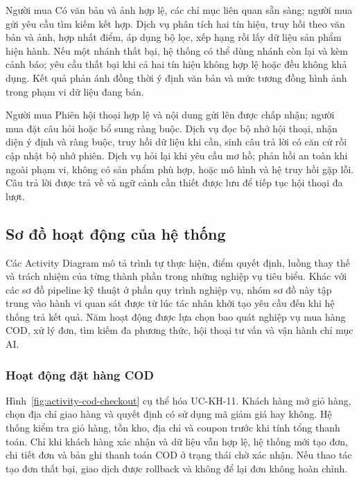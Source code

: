 {Người mua}
{Có văn bản và ảnh hợp lệ, các chỉ mục liên quan sẵn sàng; người mua gửi yêu cầu tìm kiếm kết hợp.}
{Dịch vụ phân tích hai tín hiệu, truy hồi theo văn bản và ảnh, hợp nhất điểm, áp dụng bộ lọc, xếp hạng rồi lấy dữ liệu sản phẩm hiện hành.}
{Nếu một nhánh thất bại, hệ thống có thể dùng nhánh còn lại và kèm cảnh báo; yêu cầu thất bại khi cả hai tín hiệu không hợp lệ hoặc đều không khả dụng.}
{Kết quả phản ánh đồng thời ý định văn bản và mức tương đồng hình ảnh trong phạm vi dữ liệu đang bán.}

{Người mua}
{Phiên hội thoại hợp lệ và nội dung gửi lên được chấp nhận; người mua đặt câu hỏi hoặc bổ sung ràng buộc.}
{Dịch vụ đọc bộ nhớ hội thoại, nhận diện ý định và ràng buộc, truy hồi dữ liệu khi cần, sinh câu trả lời có căn cứ rồi cập nhật bộ nhớ phiên.}
{Dịch vụ hỏi lại khi yêu cầu mơ hồ; phản hồi an toàn khi ngoài phạm vi, không có sản phẩm phù hợp, hoặc mô hình và hệ truy hồi gặp lỗi.}
{Câu trả lời được trả về và ngữ cảnh cần thiết được lưu để tiếp tục hội thoại đa lượt.}

\FloatBarrier

\subsection{Sơ đồ hoạt động của hệ thống}

Các Activity Diagram mô tả trình tự thực hiện, điểm quyết định, luồng thay thế và trách nhiệm của từng thành phần trong những nghiệp vụ tiêu biểu. Khác với các sơ đồ pipeline kỹ thuật ở phần quy trình nghiệp vụ, nhóm sơ đồ này tập trung vào hành vi quan sát được từ lúc tác nhân khởi tạo yêu cầu đến khi hệ thống trả kết quả. Năm hoạt động được lựa chọn bao quát nghiệp vụ mua hàng COD, xử lý đơn, tìm kiếm đa phương thức, hội thoại tư vấn và vận hành chỉ mục AI.

\subsubsection{Hoạt động đặt hàng COD}

Hình~\ref{fig:activity-cod-checkout} cụ thể hóa UC-KH-11. Khách hàng mở giỏ hàng, chọn địa chỉ giao hàng và quyết định có sử dụng mã giảm giá hay không. Hệ thống kiểm tra giỏ hàng, tồn kho, địa chỉ và coupon trước khi tính tổng thanh toán. Chỉ khi khách hàng xác nhận và dữ liệu vẫn hợp lệ, hệ thống mới tạo đơn, chi tiết đơn và bản ghi thanh toán COD ở trạng thái chờ xác nhận. Nếu thao tác tạo đơn thất bại, giao dịch được rollback và không để lại đơn không hoàn chỉnh.


